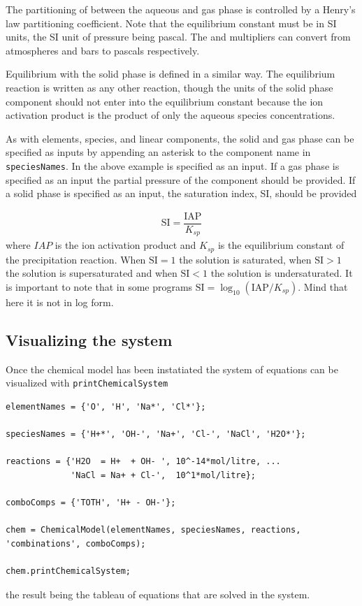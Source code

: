 \documentclass{article}
\begin{document}
The partitioning of  between the aqueous and gas phase is controlled by a Henry's law partitioning coefficient. Note that the equilibrium constant must be in SI units, the SI unit of pressure being pascal. The  and  multipliers can convert from atmospheres and bars to pascals respectively. 

Equilibrium with the solid phase is defined in a similar way. The equilibrium reaction is written as any other reaction, though the units of the solid phase component should not enter into the equilibrium constant because the ion activation product is the product of only the aqueous species concentrations.

As with elements, species, and linear components, the solid and gas phase can be specified as inputs by appending an asterisk to the component name in \verb|speciesNames|. In the above example  is specified as an input. If a gas phase is specified as an input the partial pressure of the component should be provided. If a solid phase is specified as an input, the saturation index, SI, should be provided

\begin{align}
    \text{SI} = \dfrac{\text{IAP}}{K_{sp}}
\end{align}
where $IAP$ is the ion activation product and $K_{sp}$ is the equilibrium constant of the precipitation reaction. When $\text{SI} = 1$ the solution is saturated, when $\text{SI}>1$ the solution is supersaturated and when $\text{SI}<1$ the solution is undersaturated. It is important to note that in some programs $\text{SI} = \log_{10}(\text{IAP}/K_{sp})$. Mind that here it is not in log form. 


\subsection{Visualizing the system}

Once the chemical model has been instatiated the system of equations can be visualized with \verb|printChemicalSystem|

\begin{lstlisting}
elementNames = {'O', 'H', 'Na*', 'Cl*'};

speciesNames = {'H+*', 'OH-', 'Na+', 'Cl-', 'NaCl', 'H2O*'};

reactions = {'H2O  = H+  + OH- ', 10^-14*mol/litre, ...
             'NaCl = Na+ + Cl-',  10^1*mol/litre};

comboComps = {'TOTH', 'H+ - OH-'};

chem = ChemicalModel(elementNames, speciesNames, reactions, 'combinations', comboComps);

chem.printChemicalSystem;
\end{lstlisting}
the result being the tableau of equations that are solved in the system.
\end{document}
